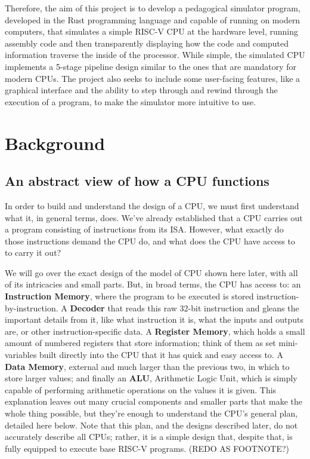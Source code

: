 \documentclass[12pt,twoside]{reedthesis}
\begin{document}
Therefore, the aim of this project is to develop a pedagogical simulator program, developed in the Rust programming language and capable of running on modern computers, that simulates a simple RISC-V CPU at the hardware level, running assembly code and then transparently displaying how the code and computed information traverse the inside of the processor. While simple, the simulated CPU implements a 5-stage pipeline design similar to the ones that are mandatory for modern CPUs. The project also seeks to include some user-facing features, like a graphical interface and the ability to step through and rewind through the execution of a program, to make the simulator more intuitive to use.

\chapter*{Background}
\section{An abstract view of how a CPU functions}
In order to build and understand the design of a CPU, we must first understand what it, in general terms, does. We've already established that a CPU carries out a program consisting of instructions from its ISA. However, what exactly do those instructions demand the CPU do, and what does the CPU have access to to carry it out?

We will go over the exact design of the model of CPU shown here later, with all of its intricacies and small parts. But, in broad terms, the CPU has access to: an \textbf{Instruction Memory}, where the program to be executed is stored instruction-by-instruction. A \textbf{Decoder} that reads this raw 32-bit instruction and gleans the important details from it, like what instruction it is, what the inputs and outputs are, or other instruction-specific data. A \textbf{Register Memory}, which holds a small amount of numbered registers that store information; think of them as set mini-variables built directly into the CPU that it has quick and easy access to. A \textbf{Data Memory}, external and much larger than the previous two, in which to store larger values; and finally an \textbf{ALU}, Arithmetic Logic Unit, which is simply capable of performing arithmetic operations on the values it is given. This explanation leaves out many crucial components and smaller parts that make the whole thing possible, but they're enough to understand the CPU's general plan, detailed here below. Note that this plan, and the designs described later, do not accurately describe all CPUs; rather, it is a simple design that, despite that, is fully equipped to execute base RISC-V programs. (REDO AS FOOTNOTE?)
\end{document}
